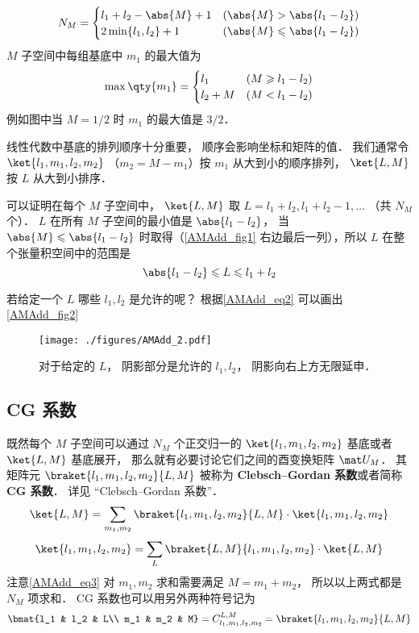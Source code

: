 \begin{equation}
N_M =
\begin{cases}
l_1 + l_2 - \abs{M} + 1 &(\abs{M} > \abs{l_1 - l_2}) \\
2\min\{l_1, l_2\}  + 1   &(\abs{M} \leqslant\abs{l_1 - l_2})
\end{cases}
\end{equation}
$M$ 子空间中每组基底中 $m_1$ 的最大值为
\begin{equation}
\max \qty{m_1} =
\begin{cases}
l_1 \quad &(M \geqslant l_1 - l_2)  \\
l_2 + M &(M < l_1 - l_2)
\end{cases}
\end{equation}
例如图中当 $M = 1/2$ 时 $m_1$ 的最大值是 $3/2$．

线性代数中基底的排列顺序十分重要， 顺序会影响坐标和矩阵的值． 我们通常令 $\ket{l_1, m_1, l_2, m_2}$ （$m_2 = M - m_1$）按 $m_1$ 从大到小的顺序排列， $\ket{L, M}$ 按 $L$ 从大到小排序．

可以证明在每个 $M$ 子空间中， $\ket{L, M}$ 取 $L = l_1 + l_2, l_1 + l_2 - 1,\dots$ （共 $N_M$ 个）． %
$L$ 在所有 $M$ 子空间的最小值是 $\abs{l_1 - l_2}$， 当 $\abs{M} \leqslant \abs{l_1 - l_2}$ 时取得（\autoref{AMAdd_fig1} 右边最后一列），所以 $L$ 在整个张量积空间中的范围是
\begin{equation}\label{AMAdd_eq2}
\abs{l_1 - l_2} \leqslant L \leqslant l_1 + l_2
\end{equation}

若给定一个 $L$ 哪些 $l_1, l_2$ 是允许的呢？ 根据\autoref{AMAdd_eq2} 可以画出\autoref{AMAdd_fig2} 
\begin{figure}[ht]
\centering
\texttt{[image: ./figures/AMAdd\_2.pdf]}
\caption{对于给定的 $L$， 阴影部分是允许的 $l_1, l_2$， 阴影向右上方无限延申．} \label{AMAdd_fig2}
\end{figure}

\subsection{CG 系数}
既然每个 $M$ 子空间可以通过 $N_M$ 个正交归一的 $\ket{l_1, m_1, l_2, m_2}$ 基底或者 $\ket{L,M}$ 基底展开， 那么就有必要讨论它们之间的酉变换矩阵 $\mat U_M$． 其矩阵元 $\braket{l_1, m_1, l_2, m_2}{L, M}$ 被称为 \textbf{Clebsch–Gordan 系数}或者简称 \textbf{CG 系数}． 详见 “Clebsch–Gordan 系数”．
\begin{equation}\label{AMAdd_eq3}
\ket{L, M} = \sum_{m_1, m_2}\braket{l_1, m_1, l_2, m_2}{L, M} \cdot \ket{l_1, m_1, l_2, m_2}
\end{equation}
\begin{equation}
\ket{l_1, m_1, l_2, m_2} = \sum_{L}\braket{L, M}{l_1, m_1, l_2, m_2} \cdot \ket{L, M}
\end{equation}
注意\autoref{AMAdd_eq3} 对 $m_1,m_2$ 求和需要满足 $M = m_1 + m_2$， 所以以上两式都是 $N_M$ 项求和． CG 系数也可以用另外两种符号记为
\begin{equation}
\bmat{l_1 & l_2 & L\\ m_1 & m_2 & M} = C_{l_1, m_1, l_2, m_2}^{L, M} = \braket{l_1, m_1, l_2, m_2}{L, M}
\end{equation}


